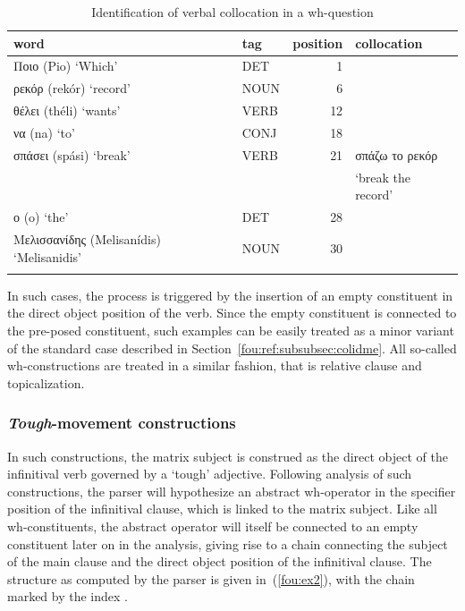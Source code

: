 \documentclass[output=paper]{langsci/langscibook}
\begin{document}

\begin{table}[h]
  {\small 
    \begin{tabular}{llrl}
      \lsptoprule
      word & tag & position & collocation \\ %
      \midrule
          {Ποιο} (Pio) `Which' & 	DET & 	1	\\
          {ρεκόρ} (rekór) `record' & NOUN & 	6 		 \\
          {θέλει}	 (théli) `wants' & VERB & 	12	 \\
          {να}	(na) `to' & CONJ	 & 18	 \\
          {σπάσει}	(spási) `break' & VERB & 	21	 & 	{σπάζω το ρεκόρ} \\ & & & `break the record'\\
          {ο}  (o) `the' & DET & 	28	 \\
          {Μελισσανίδης}	(Melisanídis) `Melisanidis' & NOUN	 & 30	 \tabularnewline	 %
          \lspbottomrule
    \end{tabular}
  }
  \caption{\label{fou:fig4}Identification of verbal collocation in a wh-question}
\end{table} 


In such cases, the  process is triggered by the insertion of an empty constituent in the direct object position of the verb. Since the empty constituent is connected to the pre-posed constituent, such examples can be easily treated as a minor variant of the standard case described in Section~\ref{fou:ref:subsubsec:colidme}. All so-called wh-constructions are treated in a similar fashion, that is relative clause and topicalization. 

\subsubsection{\textit{Tough}-movement constructions}
In such constructions, the matrix subject is construed as the direct object of the infinitival verb governed by a `tough' adjective. Following  analysis of such constructions, the parser will hypothesize an abstract wh-operator in the specifier position of the infinitival clause, which is linked to the matrix subject. Like all wh-constituents, the abstract operator will itself be connected to an empty constituent later on in the analysis, giving rise to a chain connecting the subject of the main clause and the direct object position of the infinitival clause. The structure as computed by the parser is given in~(\ref{fou:ex2}), with the chain marked by the index .
\end{document}
